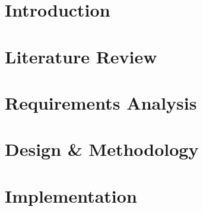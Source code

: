 \documentclass[harvard]{lincolncsthesis}
\begin{document}

\maketitle

%





\thesisTables
\thesisBodyStart



\chapter{Introduction}

 
\chapter{Literature Review}


\chapter{Requirements Analysis}


\chapter{Design \& Methodology}


\chapter{Implementation}

\end{document}
